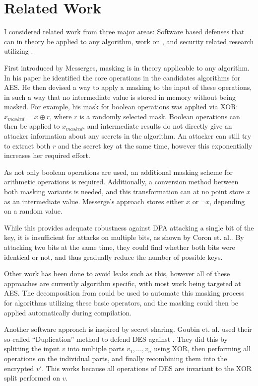 \chapter{Related Work}
\label{related}
I considered related work from three major areas:
Software based \poweranalysis{} defenses that can in theory be applied to any algorithm, work on \dual{}, and security related research utilizing \llvm{}.

First introduced by Messerges\cite{messerges2000securing}, masking is in theory applicable to any algorithm.
In his paper he identified the core operations in the candidates algorithms for AES.
He then devised a way to apply a masking to the input of these operations, in such a way that no intermediate value is stored in memory without being masked.
For example, his mask for boolean operations was applied via XOR: $x_{masked} = x \oplus r$, where $r$ is a randomly selected mask.
Boolean operations can then be applied to $x_{masked}$, and intermediate results do not directly give an attacker information about any secrets in the algorithm.
An attacker can still try to extract both $r$ and the secret key at the same time, however this exponentially increases her required effort.

As not only boolean operations are used, an additional masking scheme for arithmetic operations is required.
Additionally, a conversion method between both masking variants is needed, and this transformation can at no point store $x$ as an intermediate value.
Messerge's approach stores either $x$ or $\neg{x}$, depending on a random value.

While this provides adequate robustness against DPA attacking a single bit of the key, it is insufficient for attacks on multiple bits, as shown by Coron et. al.\cite{coron2000boolean}.
By attacking two bits at the same time, they could find whether both bits were identical or not, and thus gradually reduce the number of possible keys.

Other work has been done to avoid leaks such as this\cite{akkar2001implementation}\cite{rivain2010provably}, however all of these approaches are currently algorithm specific, with most work being targeted at AES.
The decomposition from \cite{messerges2000securing} could be used to automate this masking process for algorithms utilizing these basic operators, and the masking could then be applied automatically during compilation.

Another software approach is inspired by secret sharing.
Goubin et. al.\cite{goubin1999and} used their so-called ``Duplication'' method to defend DES against \poweranalysis{}.
They did this by splitting the input $v$ into multiple parts $v_1, ..., v_n$ using XOR, then performing all operations on the individual parts, and finally recombining them into the encrypted $v'$.
This works because all operations of DES are invariant to the XOR split performed on $v$.

